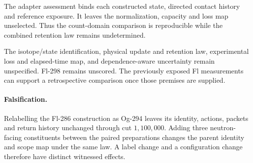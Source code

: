The adapter assessment binds each constructed state, directed contact history
and reference exposure. It leaves the normalization, capacity and loss map
unselected. Thus the count-domain comparison is reproducible while the
combined retention law remains undetermined.

The isotope/state identification, physical update and retention law,
experimental loss and elapsed-time map, and dependence-aware uncertainty remain
unspecified. Fl-298 remains unscored. The previously exposed Fl measurements
can support a retrospective comparison once those premises are supplied.

\paragraph{Falsification.}
Relabelling the Fl-286 construction as Og-294 leaves its identity, actions,
packets and return history unchanged through cut \(1{,}100{,}000\).
Adding three neutron-facing constituents between the paired preparations
changes the parent identity and scope map under the same law. A label change and
a configuration change therefore have distinct witnessed effects.

